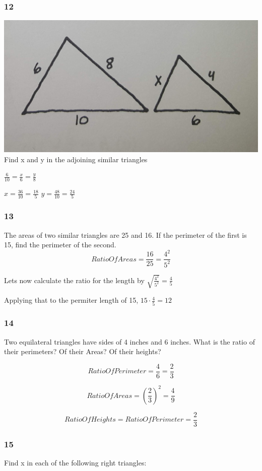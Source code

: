 \documentclass[]{report}
\begin{document}
\subsubsection{12}
\includegraphics[width=\textwidth]{precalc-geo-section1-question-12.jpg}
Find x and y in the adjoining similar triangles

$\frac{6}{10} = \frac{x}{6}= \frac{y}{8}$

$ x = \frac{36}{10} = \frac{18}{5}$
$y = \frac{48}{10} = \frac{24}{5}$

\subsubsection{13}
The areas of two similar triangles are 25 and 16. If the perimeter of the first is 15, find the perimeter of the second.
\[
RatioOfAreas =  \frac{16}{25} =   \frac{4^2}{5^2} 
\]

Lets now calculate the ratio for the length by $\sqrt{\frac{4^2}{5^2}} = \frac{4}{5}$

Applying that to the permiter length of 15, $15 \cdot \frac{4}{5} = 12$


\subsubsection{14}
Two equilateral triangles have sides of 4 inches and 6 inches. What is the ratio of their perimeters? Of their Areas? Of their heights?

\[
RatioOfPerimeter =\frac{4}{6}= \frac{2}{3}
\]

\[
RatioOfAreas = (\frac{2}{3})^2 = \frac{4}{9}
\]

\[
RatioOfHeights = RatioOfPerimeter = \frac{2}{3}
\]


\subsubsection{15}
Find x in each of the following right triangles:
\end{document}
